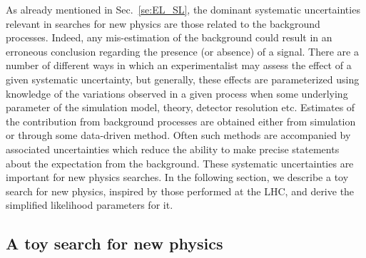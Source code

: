 \documentclass[11pt]{article}
\begin{document}
As already mentioned in Sec.~\ref{se:EL_SL}, the dominant systematic uncertainties relevant in searches for new physics are those related to the background processes. Indeed, any mis-estimation of the background could result in an erroneous conclusion regarding the presence (or absence) of a signal.
There are a number of different ways in which an experimentalist may assess the effect of a given systematic uncertainty, but generally, these effects are parameterized using knowledge of the variations observed in a given process when some underlying parameter of the simulation model, theory, detector resolution etc. Estimates of the contribution from background processes are obtained either from simulation or through some data-driven method. Often such methods are accompanied by associated  uncertainties which reduce the ability to make precise statements about the expectation from the background.
These systematic uncertainties are important for new physics searches. In the following section, we describe a toy search for new physics, inspired by those performed at the LHC, and derive the simplified likelihood parameters for it.





\subsection{A toy search for new physics}
\label{se:toy_search}
\end{document}
